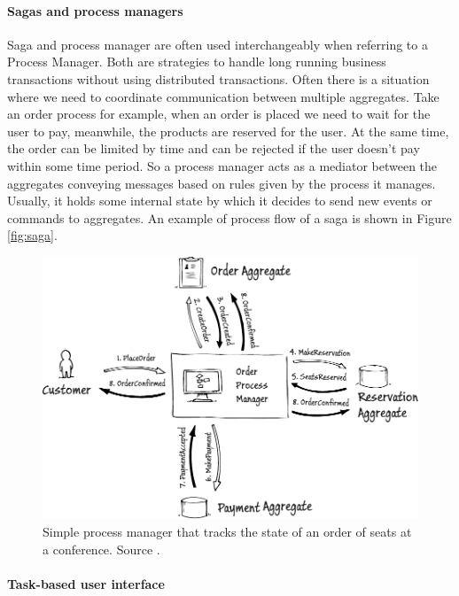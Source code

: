 \documentclass{book}
\begin{document}
\paragraph{Sagas and process managers}\label{sagas-and-process-managers}

Saga and process manager are often used interchangeably when referring
to a Process Manager. Both are strategies to handle long running
business transactions without using distributed transactions. Often
there is a situation where we need to coordinate communication between
multiple aggregates. Take an order process for example, when an order is
placed we need to wait for the user to pay, meanwhile, the products are
reserved for the user. At the same time, the order can be limited by
time and can be rejected if the user doesn't pay within some time
period. So a process manager acts as a mediator between the aggregates
conveying messages based on rules given by the process it manages.
Usually, it holds some internal state by which it decides to send new
events or commands to aggregates. An example of process flow of a saga
is shown in Figure \ref{fig:saga}.


\begin{figure}[h!]
\begin{center}
\includegraphics[width=0.7\columnwidth]{figures/saga/saga}
\caption{Simple process manager that tracks the state of an order of seats at a
conference. Source \cite{journey}.%
}
\end{center}
\end{figure}

\paragraph{Task-based user interface}\label{task-based-user-interface}
\end{document}
